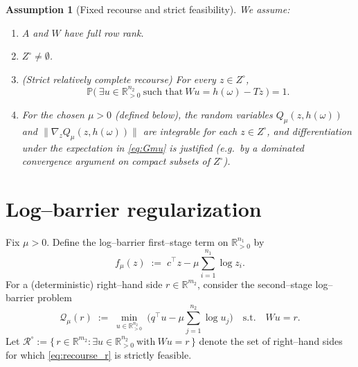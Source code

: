 \documentclass[11pt]{article}
\newcommand{\R}{\mathbb{R}}
\newcommand{\bbP}{\mathbb{P}}
\theoremstyle{plain}
\newtheorem{assumption}{Assumption}
\theoremstyle{definition}
\begin{document}
\begin{assumption}[Fixed recourse and strict feasibility]\label{ass:basic}
We assume:
\begin{enumerate}[label=\textup{(\alph*)}]
\item \label{ass:rank} $A$ and $W$ have full row rank.
\item \label{ass:SlaterZ} $Z^\circ\neq\emptyset$.
\item \label{ass:SlaterRecourse}
(\emph{Strict relatively complete recourse}) For every $z\in Z^\circ$,
\[
\bbP\big(\ \exists u\in\R^{n_2}_{>0}\ \text{such that}\ Wu=h(\omega)-Tz\ \big)=1.
\]
\item \label{ass:integrability}
For the chosen $\mu>0$ (defined below), the random variables
$Q_\mu(z,h(\omega))$ and $\|\nabla_z Q_\mu(z,h(\omega))\|$ are integrable for each $z\in Z^\circ$,
and differentiation under the expectation in \eqref{eq:Gmu} is justified
(e.g.\ by a dominated convergence argument on compact subsets of $Z^\circ$).
\end{enumerate}
\end{assumption}

\section{Log--barrier regularization}

Fix $\mu>0$. Define the log--barrier first--stage term on $\R^{n_1}_{>0}$ by
\begin{equation}\label{eq:fmu}
f_\mu(z) \;:=\; c^\top z - \mu\sum_{i=1}^{n_1}\log z_i.
\end{equation}
For a (deterministic) right--hand side $r\in\R^{m_2}$, consider the second--stage log--barrier problem
\begin{equation}\label{eq:recourse_r}
\mathcal{Q}_\mu(r)\;:=\;
\min_{u\in\R^{n_2}_{>0}}\ \Big(q^\top u - \mu\sum_{j=1}^{n_2}\log u_j\Big)
\quad\text{s.t.}\quad Wu=r.
\end{equation}
Let $\mathcal{R}^\circ := \{\, r\in\R^{m_2}: \exists u\in\R^{n_2}_{>0}\ \text{with}\ Wu=r\,\}$
denote the set of right--hand sides for which \eqref{eq:recourse_r} is strictly feasible.
\end{document}
